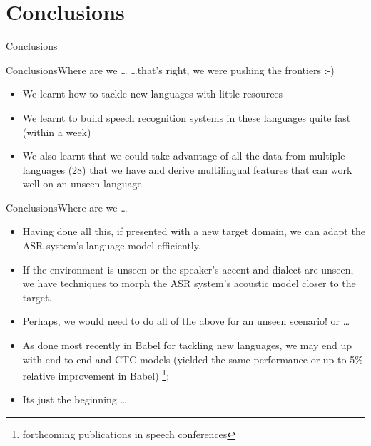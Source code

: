 \documentclass[12pt,xcolor=dvipsnames]{beamer}
\begin{document}
\section{Conclusions}

\begin{frame}
  \begin{center}
    {\color{Maroon}\Huge Conclusions\par}
  \end{center}
\end{frame}

\begin{frame}{Conclusions}{Where are we \ldots}
 \ldots that's right, we were pushing the frontiers :-)
    \begin{itemize}
    \item  We learnt how to tackle new languages with little resources
    \item  We learnt to build speech recognition systems in these languages quite fast (within a week)
    \item  We also learnt that we could  take advantage of all the data from multiple languages (28) that we have and derive multilingual features that can work well on an unseen language
    \end{itemize}
\end{frame}

\begin{frame}{Conclusions}{Where are we \ldots}
    \begin{itemize}
    \item  Having done all this, if presented with a new target domain, we can adapt the ASR system's language model efficiently.
    \item  If the environment is unseen or the speaker's accent and dialect are unseen, we have techniques to morph the ASR system's acoustic model closer to the target.
    \item  Perhaps, we would need to do all of the above for an unseen scenario!  or \ldots
    \item As done most recently in Babel for tackling new languages, we may end up with end to end and CTC models (yielded the same performance or up to 5\% relative improvement in Babel) \footnote{forthcoming publications in speech conferences}; 
    \item Its just the beginning  \ldots
    \end{itemize}
\end{frame}
\end{document}
